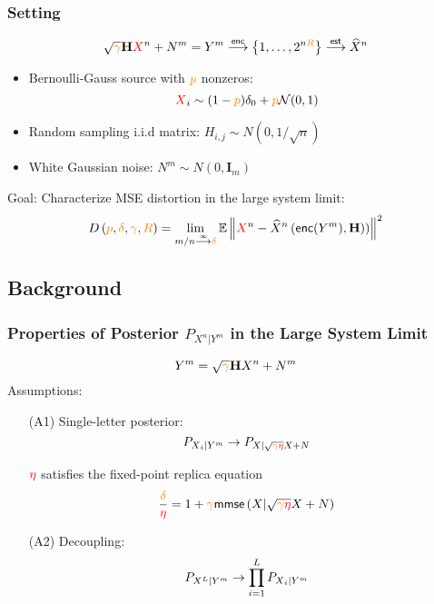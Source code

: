 \documentclass{beamer}
\newcommand{\Xc}{{\color{black} X}}
\newcommand{\pc}{{\color{orange} p}}
\newcommand{\Rc}{{\color{orange} R}}
\newcommand{\gammac}{{\color{orange} \gamma}}
\newcommand{\deltac}{{\color{orange} \delta}}
\newcommand{\enc}{\mathsf{enc}}
\begin{document}
\begin{frame}
\renewcommand{\Xc}{{\color{red} X}}
\frametitle{Setting}
\[
\sqrt{\gammac} \mathbf H {\Xc^n} + N^m = { Y^m} \overset{\enc}{\longrightarrow} \left\{1,\ldots,2^{n \Rc}  \right\} \overset{\mathsf{est}}{\longrightarrow} \widehat{X}^n
\]
\begin{itemize}
\item Bernoulli-Gauss source with $\pc$ nonzeros: 
\[
{\color{red}X}_i \sim (1-\pc)\delta_0+ \pc \mathcal N(0,1)
\]
\item Random sampling i.i.d matrix: $H_{i,j} \sim N\left(0,1/\sqrt{n} \right)$ 
\item White Gaussian noise: $N^m \sim N\left(0,\mathbf I_m \right)$ 
\end{itemize}
\begin{alertblock}{Goal:}
Characterize MSE distortion in the large system limit:
\[
D\left(\pc, \deltac, \gammac, \Rc \right) =  \lim_{m/n \overset{\infty}{\longrightarrow} \deltac}  \mathbb E \left\| {\Xc^n} - \widehat{X}^n\left(\enc({Y^m}),\mathbf H)\right) \right\|^2
\]
\end{alertblock}
\end{frame}

\subsection{Background}
\begin{frame}
\renewcommand{\Xc}{{\color{black} X}}
\frametitle{Properties of Posterior $P_{X^n|Y^m}$ in the Large System Limit}
\[
{Y^m} = \sqrt{ \gammac} \mathbf H {\Xc^n} + N^m
\]
Assumptions:
\begin{itemize}
\item[(A1)] Single-letter posterior:
\[
P_{ {\Xc}_i| Y^m } \rightarrow P_{\Xc|\sqrt{\gammac {\color{red} \eta} }{\Xc}+N}
\]
\begin{tikzpicture}

\end{tikzpicture}
${\color{red} \eta}$ satisfies the fixed-point replica equation 
\[
\frac{ \deltac}{\color{red} \eta} = 1 + { \gammac} \mathsf{mmse}\left(\Xc | \sqrt{ \gammac {\color{red} \eta}} \Xc+N \right)
\]
\item[(A2)] Decoupling:
\[
P_{\Xc^L| { Y^m} } \rightarrow  \prod_{i=1}^L P_{ \Xc_i|Y^m} 
\]
\end{itemize}
\end{frame}
\end{document}
